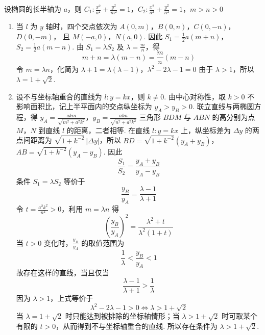 \begin{solution}
设椭圆的长半轴为 \(a\)，则
\(C_1:\frac{x^2}{a^2}+\frac{y^2}{m^2}=1\)，\(C_2:\frac{x^2}{a^2}+\frac{y^2}{n^2}=1\)，\(m>n>0\)
\begin{enumerate}
\item 当 \(l\) 为 \(y\) 轴时，四个交点依次为
\(A(0,m)\)，\(B(0,n)\)，\(C(0,-n)\)，\(D(0,-m)\)，
且 \(M(-a,0)\)，\(N(a,0)\). 因此
\(S_1=\frac12a(m+n)\)，\(S_2=\frac12a(m-n)\).
由 \(S_1=\lambda S_2\) 及 \(\lambda=\frac mn\)，得
\[
 m+n=\lambda(m-n)=\frac mn(m-n)
\]
令 \(m=\lambda n\)，化简为
\(\lambda+1=\lambda(\lambda-1)\)，\(\lambda^2-2\lambda-1=0\)
由于 \(\lambda>1\)，所以 \(\lambda=1+\sqrt2\).

\item 设不与坐标轴重合的直线为 \(l:y=kx\)，则 \(k\ne0\). 由中心对称性，取 \(k>0\) 不影响面积比，记上半平面内的交点纵坐标为 \(y_A>y_B>0\). 联立直线与两椭圆方程，得
\(y_A=\frac{akm}{\sqrt{m^2+a^2k^2}}\)，\(y_B=\frac{akn}{\sqrt{n^2+a^2k^2}}\)
三角形 \(BDM\) 与 \(ABN\) 的高分别为点 \(M\)，\(N\) 到直线 \(l\) 的距离，二者相等. 在直线 \(l:y=kx\) 上，纵坐标差为 \(\Delta y\) 的两点间距离为 \(\sqrt{1+k^{-2}}\,|\Delta y|\)，所以
\(BD=\sqrt{1+k^{-2}}(y_A+y_B)\)，\(AB=\sqrt{1+k^{-2}}(y_A-y_B)\).
因此
\[
 \frac{S_1}{S_2}=\frac{y_A+y_B}{y_A-y_B}
\]
条件 \(S_1=\lambda S_2\) 等价于
\[
 \frac{y_B}{y_A}=\frac{\lambda-1}{\lambda+1}
\]
令 \(t=\frac{a^2k^2}{n^2}>0\)，利用 \(m=\lambda n\) 得
\[
 \left(\frac{y_B}{y_A}\right)^2
 =\frac{\lambda^2+t}{\lambda^2(1+t)}
\]
当 \(t>0\) 变化时，\(\frac{y_B}{y_A}\) 的取值范围为
\[
 \frac1\lambda<\frac{y_B}{y_A}<1
\]
故存在这样的直线，当且仅当
\[
 \frac{\lambda-1}{\lambda+1}>\frac1\lambda
\]
因为 \(\lambda>1\)，上式等价于
\[
 \lambda^2-2\lambda-1>0
 \iff \lambda>1+\sqrt2
\]
当 \(\lambda=1+\sqrt2\) 时只能达到被排除的坐标轴情形；当 \(\lambda>1+\sqrt2\) 时可取某个有限的 \(t>0\)，从而得到不与坐标轴重合的直线. 所以存在条件为 \(\lambda>1+\sqrt2\).
\end{enumerate}
\end{solution}
